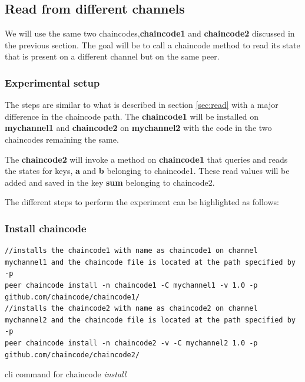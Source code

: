 \documentclass[
  a4paper,  %
  twoside,  %
  bibliography=totoc,
  headsepline,
  cleardoublepage=empty,
  parskip=half,
  draft=false
]{scrbook}
\begin{document}
\subsection{Read from different channels}
\label{subs:read2}
We will use the same two chaincodes,\textbf{chaincode1} and \textbf{chaincode2} discussed in the previous section. The goal will be to call a chaincode method to read its state that is present on a different channel but on the same peer.
\subsubsection{Experimental setup}
The steps are similar to what is described in section \ref{sec:read} with a major difference in the chaincode path. The \textbf{chaincode1} will be installed on \textbf{mychannel1} and \textbf{chaincode2} on \textbf{mychannel2} with the code in the two chaincodes remaining the same.

The \textbf{chaincode2} will invoke a method on \textbf{chaincode1} that queries and reads the states for keys, \textbf{a} and \textbf{b} belonging to chaincode1. These read values will be added and saved in the key \textbf{sum} belonging to chaincode2.

The different steps to perform the experiment can be highlighted as follows:
\subsubsection{Install chaincode}
\begin{Listing}[h!]
\begin{lstlisting}
//installs the chaincode1 with name as chaincode1 on channel mychannel1 and the chaincode file is located at the path specified by -p
peer chaincode install -n chaincode1 -C mychannel1 -v 1.0 -p github.com/chaincode/chaincode1/
//installs the chaincode2 with name as chaincode2 on channel mychannel2 and the chaincode file is located at the path specified by -p
peer chaincode install -n chaincode2 -v -C mychannel2 1.0 -p github.com/chaincode/chaincode2/
\end{lstlisting}
\caption{cli command for chaincode \textit{install}}
\label{lst:ci2}
\end{Listing}
\end{document}

